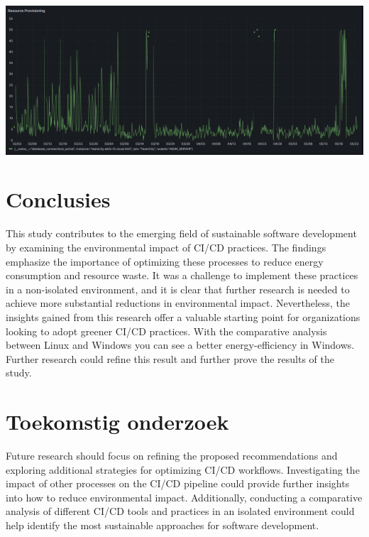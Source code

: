 \documentclass[a0,portrait]{hogent-poster}
\begin{document}
\begin{multicols}{2}
\begin{center}
  \captionsetup{type=figure}
  \includegraphics[width=1.0\linewidth]{graphics/DB connections.png}
\end{center}


\section{Conclusies}
This study contributes to the emerging field of sustainable software development by examining the environmental impact of CI/CD practices. The findings emphasize the importance of optimizing these processes to reduce energy consumption and resource waste. It was a challenge to implement these practices in a non-isolated environment, and it is clear that further research is needed to achieve more substantial reductions in environmental impact. Nevertheless, the insights gained from this research offer a valuable starting point for organizations looking to adopt greener CI/CD practices. With the comparative analysis between Linux and Windows you can see a better energy-efficiency in Windows. Further research could refine this result and further prove the results of the study.

\section{Toekomstig onderzoek}
Future research should focus on refining the proposed recommendations and exploring additional strategies for optimizing CI/CD workflows. Investigating the impact of other processes on the CI/CD pipeline could provide further insights into how to reduce environmental impact. Additionally, conducting a comparative analysis of different CI/CD tools and practices in an isolated environment could help identify the most sustainable approaches for software development.


\end{multicols}
\end{document}
